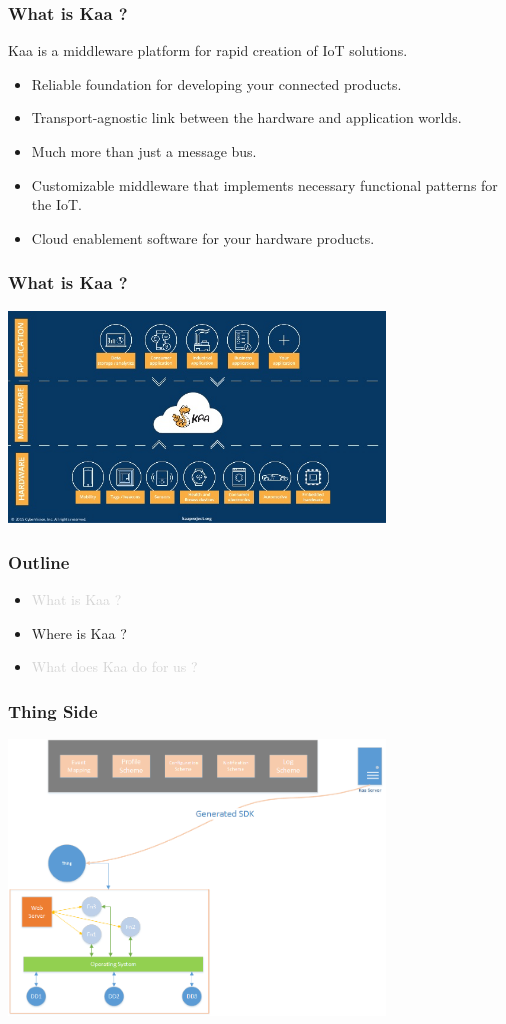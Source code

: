 \documentclass{beamer}
\begin{document}
\begin{frame}
	\frametitle{What is Kaa ?}
	\centering Kaa is a middleware platform for rapid creation of IoT solutions.
	\vspace{1cm}
	\begin{itemize}
		\item Reliable foundation for developing your connected products.
		\item \textcolor{TextGreen}{Transport-agnostic} link between the hardware and application worlds.
		\item Much more than just a message bus.
		\item \textcolor{TextOrange}{Customizable} middleware that implements necessary functional patterns for the IoT.
		\item \textcolor{Ocean}{Cloud enablement} software for your hardware products.
	\end{itemize}
\end{frame}

\begin{frame}
	\frametitle{What is Kaa ?}
	\centering\includegraphics[width=10cm]{diags/kaa-arch-1.jpg}
\end{frame}

\begin{frame}
	\frametitle{Outline}
	\begin{itemize}
		\item \textcolor{LightGray}{What is Kaa ?}
		\item Where is Kaa ?
		\item \textcolor{LightGray}{What does Kaa do for us ?}
	\end{itemize}
\end{frame}

\begin{frame}
	\frametitle{Thing Side}
	\centering\includegraphics[width=10cm]{diags/kaa-arch-2.png}
\end{frame}
\end{document}
